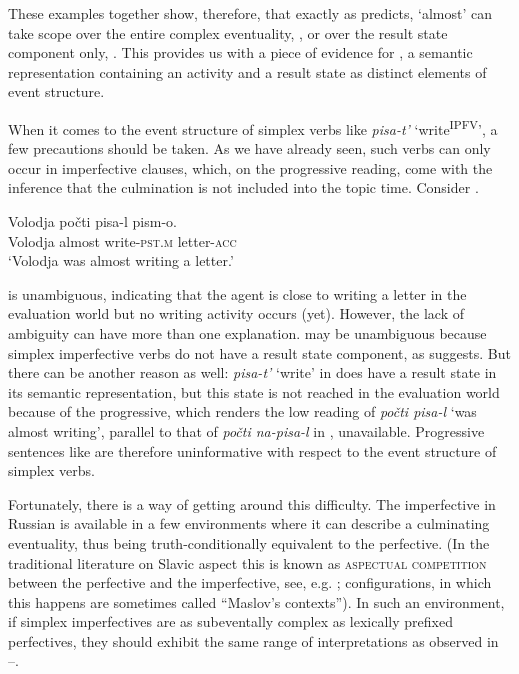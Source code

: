 \documentclass[output=paper,colorlinks,citecolor=brown]{langscibook}
\begin{document}
These examples together show, therefore, that exactly as  predicts, ‘almost’ can take scope over the entire complex eventuality, , or over the result state component only, . This provides us with a piece of evidence for , a semantic representation containing an activity and a result state as distinct elements of event structure.

When it comes to the event structure of simplex verbs like \textit{pisa-t’} ‘write\textsuperscript{IPFV}’, a few precautions should be taken. As we have already seen, such verbs can only occur in imperfective clauses, which, on the progressive reading, come with the inference that the culmination is not included into the topic time. Consider .

\ea\label{tat:ex:41}
\gll Volodja  počti pisa-l  pism-o.\\
  Volodja  almost  write-\textsc{pst.m}  letter-\textsc{acc}\\
\glt ‘Volodja was almost writing a letter.’
\z

\noindent {} is unambiguous, indicating that the agent is close to writing a letter in the evaluation world but no writing activity occurs (yet). However, the lack of ambiguity can have more than one explanation.  may be unambiguous because simplex imperfective verbs do not have a result state component, as  suggests. But there can be another reason as well: \textit{pisa-t’} ‘write’ in  does have a result state in its semantic representation, but this state is not reached in the evaluation world because of the progressive, which renders the low reading of \textit{počti pisa-l} ‘was almost writing’, parallel to that of \textit{počti na-pisa-l} in , unavailable. Progressive sentences like  are therefore uninformative with respect to the event structure of simplex verbs.

Fortunately, there is a way of getting around this difficulty. The imperfective in Russian is available in a few environments where it can describe a culminating eventuality, thus being truth-conditionally equivalent to the perfective. (In the traditional literature on Slavic aspect this is known as \textsc{aspectual competition} between the perfective and the imperfective, see, e.g. \citealt{Maslov1984}; configurations, in which this happens are sometimes called “Maslov’s contexts”). In such an environment, if simplex imperfectives are as subeventally complex as lexically prefixed perfectives, they should exhibit the same range of interpretations as observed in --.
\end{document}
